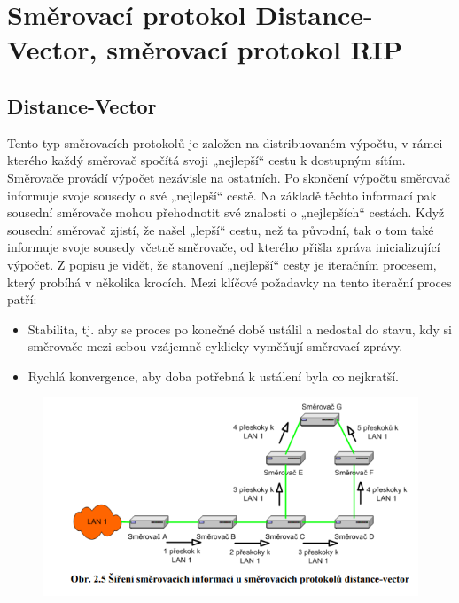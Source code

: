 \section{Směrovací protokol Distance-Vector, směrovací protokol RIP}
\subsection{Distance-Vector}
Tento typ směrovacích protokolů je založen na distribuovaném výpočtu, v rámci 
kterého každý směrovač spočítá svoji „nejlepší“ cestu k dostupným sítím. Směrovače provádí 
výpočet nezávisle na ostatních. Po skončení výpočtu směrovač informuje svoje sousedy o své 
„nejlepší“ cestě. Na základě těchto informací pak sousední směrovače mohou přehodnotit své 
znalosti o „nejlepších“ cestách. Když sousední směrovač zjistí, že našel „lepší“ cestu, než ta 
původní, tak o tom také informuje svoje sousedy včetně směrovače, od kterého přišla zpráva 
inicializující výpočet. Z popisu je vidět, že stanovení „nejlepší“ cesty je iteračním procesem, 
který probíhá v několika krocích. Mezi klíčové požadavky na tento iterační 
proces patří:
\begin{itemize}
\item Stabilita, tj. aby se proces po konečné době ustálil a nedostal do stavu, kdy si 
směrovače mezi sebou vzájemně cyklicky vyměňují směrovací zprávy.
\item Rychlá konvergence, aby doba potřebná k ustálení byla co nejkratší.
\end{itemize}
\begin{figure}[!h]
  \begin{center}
    \includegraphics[scale=1]{BPC-HWS/images/distancevektor.png}
  \end{center}
\end{figure}

